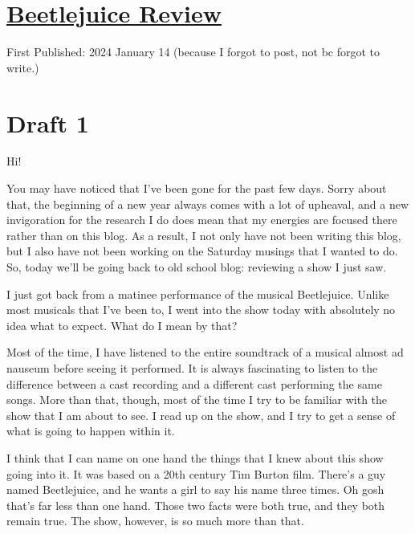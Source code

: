 \documentclass[12pt]{article}[titlepage]
\renewcommand{\,}{\textsuperscript{,}}
\begin{document}
\doublespacing
\section{\href{beetlejuice-review.html}{Beetlejuice Review}}
First Published: 2024 January 14 (because I forgot to post, not bc forgot to write.)

\section{Draft 1}
Hi!

You may have noticed that I've been gone for the past few days.
Sorry about that, the beginning of a new year always comes with a lot of upheaval, and a new invigoration for the research I do does mean that my energies are focused there rather than on this blog.
As a result, I not only have not been writing this blog, but I also have not been working on the Saturday musings that I wanted to do.
So, today we'll be going back to old school blog: reviewing a show I just saw.

I just got back from a matinee performance of the musical Beetlejuice.
Unlike most musicals that I've been to, I went into the show today with absolutely no idea what to expect.
What do I mean by that?

Most of the time, I have listened to the entire soundtrack of a musical almost ad nauseum before seeing it performed.
It is always fascinating to listen to the difference between a cast recording and a different cast performing the same songs.
More than that, though, most of the time I try to be familiar with the show that I am about to see.
I read up on the show, and I try to get a sense of what is going to happen within it.

I think that I can name on one hand the things that I knew about this show going into it.
It was based on a 20th century Tim Burton film.
There's a guy named Beetlejuice, and he wants a girl to say his name three times.
Oh gosh that's far less than one hand.
Those two facts were both true, and they both remain true.
The show, however, is so much more than that.
\end{document}
